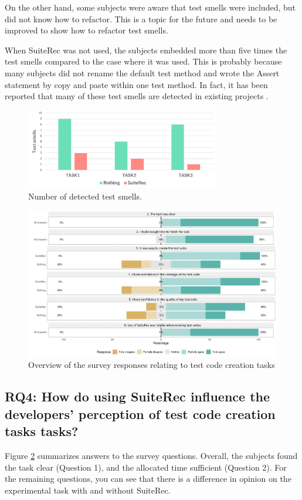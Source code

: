 \documentclass[conference]{IEEEtran}
\begin{document}
On the other hand, some subjects were aware that test smells were included, but did not know how to refactor. This is a topic for the future and needs to be improved to show how to refactor test smells.

When SuiteRec was not used, the subjects embedded more than five times the test smells compared to the case where it was used. This is probably because many subjects did not rename the default test method and wrote the Assert statement by copy and paste within one test method. In fact, it has been reported that many of these test smells are detected in existing projects \cite{b9}.


\begin{figure}[htbp]
\centerline{\includegraphics[width=8.5cm]{smells.pdf}}
\caption{Number of detected test smells.}
\label{fig8}
\end{figure}

\begin{figure}[t]
 \begin{center}
  \includegraphics[width=18.5cm]{suiterec-expt.pdf}
  \caption{Overview of the survey responses relating to test code creation tasks}
  \label{fig9}
 \end{center}
\end{figure}

\subsection{RQ4: How do using SuiteRec influence the developers’ perception of test code creation tasks tasks?}
Figure \ref{fig9} summarizes answers to the survey questions. Overall, the subjects found the task clear (Question 1), and the allocated time sufficient (Question 2). For the remaining questions, you can see that there is a difference in opinion on the experimental task with and without SuiteRec. 
\end{document}
